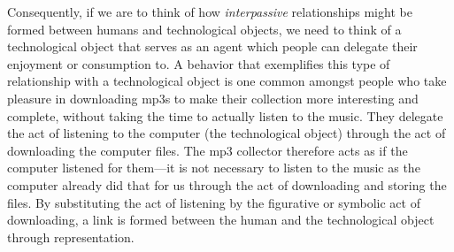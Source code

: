 Consequently, if we are to think of how \emph{interpassive} relationships might be formed between humans and technological objects, we need to think of a technological object that serves as an agent which people can delegate their enjoyment or consumption to. A behavior that exemplifies this type of relationship with a technological object is one common amongst people who take pleasure in downloading mp3s to make their collection more interesting and complete, without taking the time to actually listen to the music. They delegate the act of listening to the computer (the technological object) through the act of downloading the computer files. The mp3 collector therefore acts as if the computer listened for them---it is not necessary to listen to the music as the computer already did that for us through the act of downloading and storing the files. By substituting the act of listening by the figurative or symbolic act of downloading, a link is formed between the human and the technological object through representation. 


